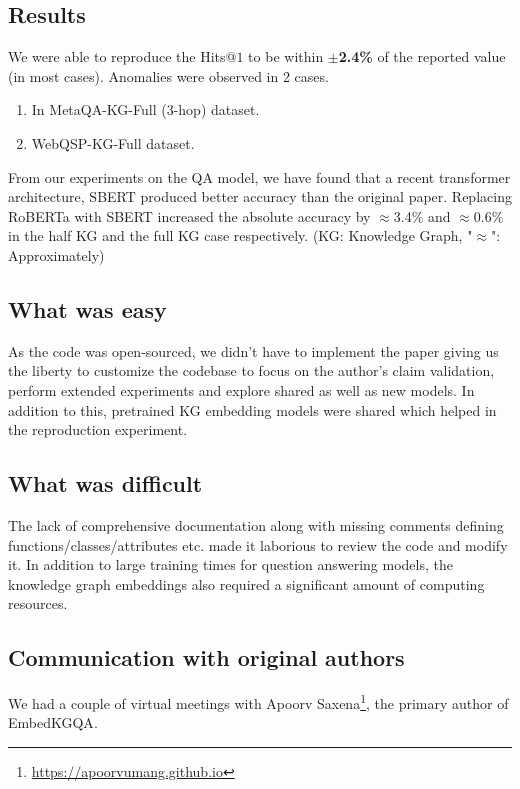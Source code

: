 \subsection{Results}
We were able to reproduce the Hits@$1$ to be within \textbf{$\pm$2.4\%} of the reported value (in most cases). Anomalies were observed in 2 cases. 
\begin{enumerate}
\item In MetaQA-KG-Full (3-hop) dataset.
\item WebQSP-KG-Full dataset.
\end{enumerate}
From our experiments on the QA model, we have found that a recent transformer architecture, SBERT\cite{reimers-2019-sentence-bert} produced better accuracy than the original paper. Replacing RoBERTa\cite{roberta} with SBERT\cite{reimers-2019-sentence-bert} increased the absolute accuracy by $\approx$3.4\% and $\approx$0.6\% in the half KG and the full KG case respectively. (KG: Knowledge Graph, "$\approx$": Approximately)



\subsection{What was easy}
As the code was open-sourced, we didn't have to implement the paper giving us the liberty to customize the codebase to focus on the author's claim validation, perform extended experiments and explore shared as well as new models. In addition to this, pretrained KG embedding models were shared which helped in the reproduction experiment. 

\subsection{What was difficult}

The lack of comprehensive documentation along with missing comments defining functions/classes/attributes etc. made it laborious to review the code and modify it. In addition to large training times for question answering models, the knowledge graph embeddings also required a significant amount of computing resources.

\subsection{Communication with original authors}
We had a couple of virtual meetings with Apoorv Saxena\footnote{\url{https://apoorvumang.github.io}}, the primary author of EmbedKGQA\cite{saxena-etal-2020-improving}. 


